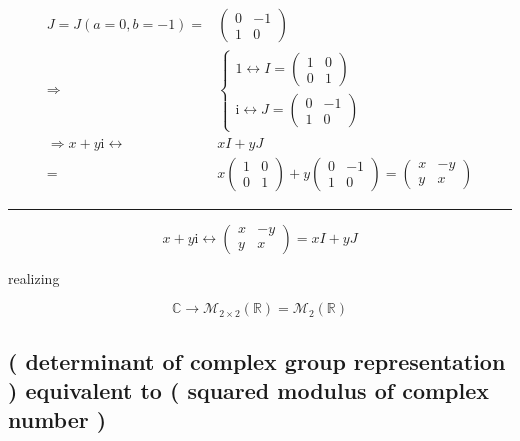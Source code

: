 \documentclass[
]{book}
\theoremstyle{definition}
\theoremstyle{definition}
\theoremstyle{definition}
\theoremstyle{definition}
\theoremstyle{remark}
\begin{document}
\[
\begin{aligned}
J=J\left(a=0,b=-1\right)= & \begin{pmatrix}0 & -1\\
1 & 0
\end{pmatrix}\\
\Rightarrow & \begin{cases}
1\leftrightarrow I=\begin{pmatrix}1 & 0\\
0 & 1
\end{pmatrix}\\
\mathrm{i}\leftrightarrow J=\begin{pmatrix}0 & -1\\
1 & 0
\end{pmatrix}
\end{cases}\\
\Rightarrow x+y\mathrm{i}\leftrightarrow & xI+yJ\\
= & x\begin{pmatrix}1 & 0\\
0 & 1
\end{pmatrix}+y\begin{pmatrix}0 & -1\\
1 & 0
\end{pmatrix}=\begin{pmatrix}x & -y\\
y & x
\end{pmatrix}
\end{aligned}
\]

\begin{center}\rule{0.5\linewidth}{0.5pt}\end{center}

\[
x+y\mathrm{i}\leftrightarrow\begin{pmatrix}x & -y\\
y & x
\end{pmatrix}=xI+yJ
\]

realizing

\[
\mathbb{C}\rightarrow\mathcal{M}_{2\times2}\left(\mathbb{R}\right)=\mathcal{M}_{2}\left(\mathbb{R}\right)
\]

\hypertarget{determinant-of-complex-group-representation-equivalent-to-squared-modulus-of-complex-number}{%
\subsection{( determinant of complex group representation ) equivalent to ( squared modulus of complex number )}\label{determinant-of-complex-group-representation-equivalent-to-squared-modulus-of-complex-number}}
\end{document}
